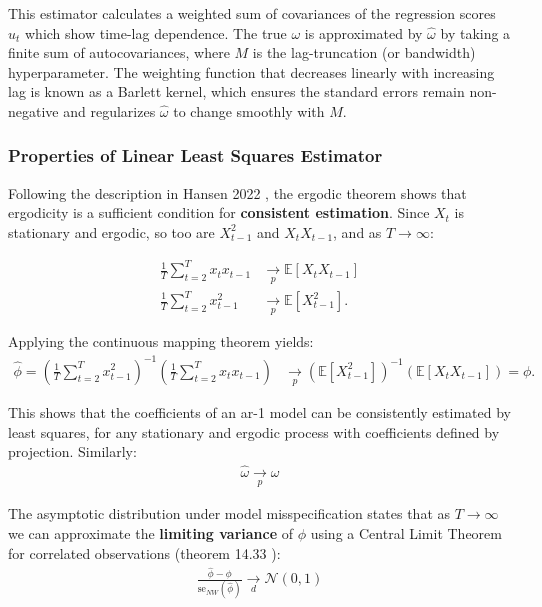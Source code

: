 \documentclass[main.tex]{subfiles}
\begin{document}
This estimator calculates a weighted sum of covariances of the regression scores $\hat u_t$ which show time-lag dependence. The true $\omega$ is approximated by $\hat \omega$ by taking a finite sum of autocovariances, where $M$ is the lag-truncation (or bandwidth) hyperparameter. The weighting function that decreases linearly with increasing lag is known as a Barlett kernel, which ensures the standard errors remain non-negative and regularizes $\hat \omega$ to change smoothly with $M$.

\subsubsection{Properties of Linear Least Squares Estimator}
Following the description in Hansen 2022 \cite{hansen_econometrics_2022}, the ergodic theorem shows that ergodicity is a sufficient condition for \textbf{consistent estimation}. Since $X_t$ is stationary and ergodic, so too are $X_{t-1}^2$ and $X_t X_{t-1}$, and as $T \to \infty$:

\begin{align*}
    \frac{1}{T} \sum_{t=2}^T x_t x_{t-1} &\underset{p}{\to} \mathbb{E}[X_t X_{t-1}]\\
    \frac{1}{T} \sum_{t=2}^T x_{t-1}^2 &\underset{p}{\to} \mathbb{E}[X_{t-1}^2].
\end{align*}

Applying the continuous mapping theorem yields:
\begin{align*}
    \hat\phi = (\frac{1}{T} \sum_{t=2}^T x_{t-1}^2)^{-1} ( \frac{1}{T} \sum_{t=2}^T x_t x_{t-1}) &\underset{p}{\to} (\mathbb{E}[X_{t-1}^2])^{-1}(\mathbb{E}[X_t X_{t-1}]) = \phi.
\end{align*}

This shows that the coefficients of an ar-1 model can be consistently estimated by least squares, for any stationary and ergodic process with coefficients defined by projection. Similarly:
\begin{align*}
    \hat \omega \underset{p}{\to} \omega
\end{align*}


The asymptotic distribution under model misspecification states that as $T\to\infty$ we can approximate the \textbf{limiting variance} of $\phi$ using a Central Limit Theorem for correlated observations (theorem 14.33 \cite{hansen_econometrics_2022}):
\begin{align*}
\frac{\hat\phi - \phi}{\text{se}_{NW}(\hat\phi)} \underset{d}{\to} \mathcal{N}(0, 1)
\end{align*}
\end{document}

